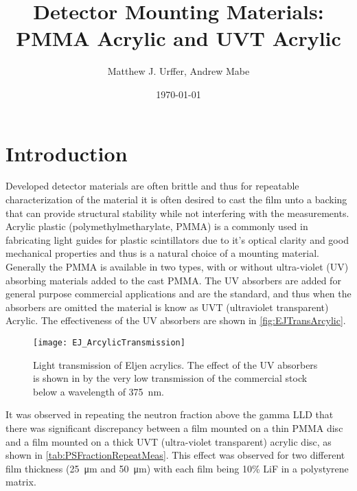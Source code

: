 \documentclass[draftcls,onecolumn]{IEEEtran}
\begin{document}
\title{Detector Mounting Materials: PMMA Acrylic and UVT Acrylic}
\author{Matthew J. Urffer, Andrew Mabe}
\date{\today}
\maketitle

\tableofcontents
\listoffigures
\listoftables
\section{Introduction}
Developed detector materials are often brittle and thus for repeatable characterization of the material it is often desired to cast the film unto a backing that can provide structural stability while not interfering with the measurements.
Acrylic plastic (polymethylmetharylate, PMMA) is a commonly used in fabricating light guides for plastic scintillators due to it's optical clarity and good mechanical properties and thus is a natural choice of a mounting material.
Generally the PMMA is available in two types, with or without ultra-violet (UV) absorbing materials added to the cast PMMA.
The UV absorbers are added for general purpose commercial applications and are the standard, and thus when the absorbers are omitted the material is know as UVT (ultraviolet transparent) Acrylic.
The effectiveness of the UV absorbers are shown in \autoref{fig:EJTransArcylic}.
\begin{figure}
  \centering
  \texttt{[image: EJ\_ArcylicTransmission]}
	\caption[Light Transmission of Eljen Acrylics (Eljen)]{Light transmission of Eljen acrylics.  The effect of the UV absorbers is shown in by the very low transmission of the commercial stock below a wavelength of \SI{375}{\nm}.}
	\label{fig:EJTransArcylic}
\end{figure}	
It was observed in repeating the neutron fraction above the gamma LLD that there was significant discrepancy between a film mounted on a thin PMMA disc and a film mounted on a thick UVT (ultra-violet transparent) acrylic disc, as shown in \autoref{tab:PSFractionRepeatMeas}.
This effect was observed for two different film thickness (\SI{25}{\um} and \SI{50}{\um}) with each film being 10\% LiF in a polystyrene matrix.
\end{document}
